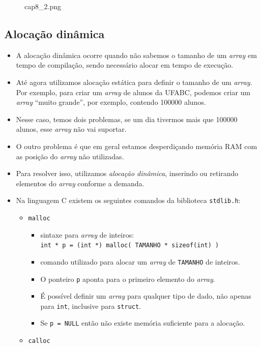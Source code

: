\documentclass[12pt,a4paper]{article}
\providecommand{\tightlist}{%
      \setlength{\itemsep}{0pt}\setlength{\parskip}{0pt}}
\begin{document}
    \begin{figure}
\centering
\caption{cap8\_2.png}
\end{figure}

    \hypertarget{alocauxe7uxe3o-dinuxe2mica}{%
\subsection{Alocação dinâmica}\label{alocauxe7uxe3o-dinuxe2mica}}

    \begin{itemize}
\item
  A alocação dinâmica ocorre quando não sabemos o tamanho de um
  \emph{array} em tempo de compilação, sendo necessário alocar em tempo
  de execução.
\item
  Até agora utilizamos alocação estática para definir o tamanho de um
  \emph{array}. Por exemplo, para criar um \emph{array} de alunos da
  UFABC, podemos criar um \emph{array} ``muito grande'', por exemplo,
  contendo 100000 alunos.
\item
  Nesse caso, temos dois problemas, se um dia tivermos mais que 100000
  alunos, esse \emph{array} não vai suportar.
\item
  O outro problema é que em geral estamos desperdiçando memória RAM com
  as posição do \emph{array} não utilizadas.
\item
  Para resolver isso, utilizamos \emph{alocação dinâmica}, inserindo ou
  retirando elementos do \emph{array} conforme a demanda.
\item
  Na linguagem C existem os seguintes comandos da biblioteca
  \texttt{stdlib.h}:

  \begin{itemize}
  \tightlist
  \item
    \texttt{malloc}

    \begin{itemize}
    \tightlist
    \item
      sintaxe para \emph{array} de inteiros:
      \texttt{int\ *\ p\ =\ (int\ *)\ malloc(\ TAMANHO\ *\ sizeof(int)\ )}
    \item
      comando utilizado para alocar um \emph{array} de \texttt{TAMANHO}
      de inteiros.
    \item
      O ponteiro \texttt{p} aponta para o primeiro elemento do
      \emph{array}.
    \item
      É possível definir um \emph{array} para qualquer tipo de dado, não
      apenas para \texttt{int}, inclusive para \texttt{struct}.
    \item
      Se \texttt{p\ =\ NULL} então não existe memória suficiente para a
      alocação.
    \end{itemize}
  \item
    \texttt{calloc}


\end{itemize}
\end{itemize}
\end{document}
